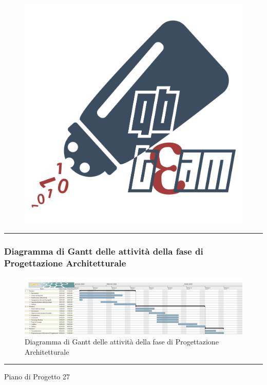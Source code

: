 \newpage
\begin{landscape}
\begin{figure}[h]
	\includegraphics[scale=0.035]{../../Utilita/Immagini/qbteam.png}
\end{figure}
\hrule

\subsubsection{Diagramma di Gantt delle attività della fase di Progettazione Architetturale}
\pagestyle{empty}
\begin{figure}[h]
	\centering
	\includegraphics[scale=0.34]{Sezioni/DiagrammiGantt/ProgettazioneArchitetturale.png}
	\caption{Diagramma di Gantt delle attività della fase di Progettazione Architetturale}	
\end{figure}

\hrule
\vskip 6pt
Piano di Progetto \hskip 25cm {27} 
\end{landscape}
\clearpage